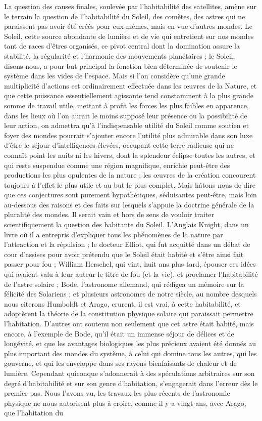 \documentclass[a4paper, 11pt, oneside, landscape]{article}
\begin{document}
La question des causes finales, soulevée par l'habitabilité des satellites, amène sur le terrain la question de l'habitabilité du Soleil, des comètes, des astres qui ne paraissent pas avoir été créés pour eux-mêmes, mais en vue d'autres mondes. Le Soleil, cette source abondante de lumière et de vie qui entretient sur nos mondes tant de races d'êtres organisés, ce pivot central dont la domination assure la stabilité, la régularité et l'harmonie des mouvements planétaires ; le Soleil, disons-nous, a pour but principal la fonction bien déterminée de soutenir le système dans les vides de l'espace. Mais si l'on considère qu'une grande multiplicité d'actions est ordinairement effectuée dans les œuvres de la Nature, et que cette puissance essentiellement agissante tend constamment à la plus grande somme de travail utile, mettant à profit les forces les plus faibles en apparence, dans les lieux où l'on aurait le moins supposé leur présence ou la possibilité de leur action, on admettra qu'à l'indispensable utilité du Soleil comme soutien et foyer des mondes pourrait s'ajouter encore l'utilité plus admirable dans son luxe d'être le séjour d'intelligences élevées, occupant cette terre radieuse qui ne connaît point les nuits ni les hivers, dont la splendeur éclipse toutes les autres, et qui reste suspendue comme une région magnifique, enrichie peut-être des productions les plus opulentes de la nature ; les œuvres de la création concourent toujours à l'effet le plus utile et au but le plus complet. Mais hâtons-nous de dire que ces conjectures sont purement hypothétiques, séduisantes peut-être, mais loin au-dessous des raisons et des faits sur lesquels s'appuie la doctrine générale de la pluralité des mondes. Il serait vain et hors de sens de vouloir traiter scientifiquement la question des habitante du Soleil. L'Anglais Knight, dans un livre où il a entrepris d'expliquer tous les phénomènes de la nature par l'attraction et la répulsion ; le docteur Elliot, qui fut acquitté dans un débat de cour d'assises pour avoir prétendu que le Soleil était habité et s'être ainsi fait passer pour fou ; William Herschel, qui vint, huit ans plus tard, épouser ces idées qui avaient valu à leur auteur le titre de fou (et la vie), et proclamer l'habitabilité de l'astre solaire ; Bode, l'astronome allemand, qui rédigea un mémoire sur la félicité des Solariens ; et plusieurs astronomes de notre siècle, au nombre desquels nous citerons Humboldt et Arago, crurent, il est vrai, à cette habitabilité, et adoptèrent la théorie de la constitution physique solaire qui paraissait permettre l'habitation. D'autres ont soutenu non seulement que cet astre était habité, mais encore, à l'exemple de Bode, qu'il était un immense séjour de délices et de longévité, et que les avantages biologiques les plus précieux avaient été donnés au plus important des mondes du système, à celui qui domine tous les autres, qui les gouverne, et qui les enveloppe dans ses rayons bienfaisants de chaleur et de lumière. Cependant quiconque s'adonnerait à des spéculations arbitraires sur son degré d'habitabilité et sur son genre d'habitation, s'engagerait dans l'erreur dès le premier pas. Nous l'avons vu, les travaux les plus récents de l'astronomie physique ne nous autorisent plus à croire, comme il y a vingt ans, avec Arago, que l'habitation du 
\end{document}
